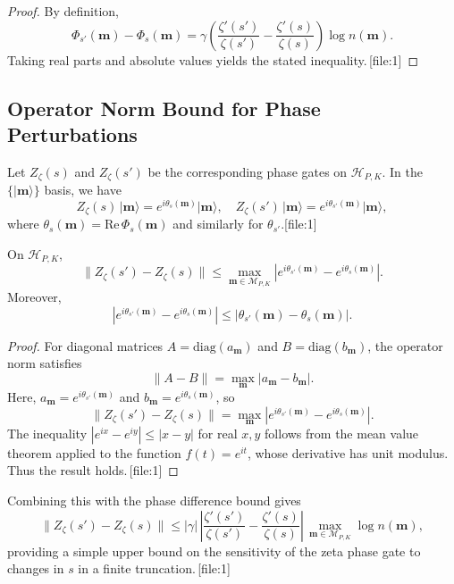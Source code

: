 \documentclass[11pt]{article}
\begin{document}
\begin{proof}
By definition,
\[
\Phi_{s'}(\mathbf{m}) - \Phi_s(\mathbf{m}) = \gamma \left( \frac{\zeta'(s')}{\zeta(s')} - \frac{\zeta'(s)}{\zeta(s)} \right) \log n(\mathbf{m}).
\]
Taking real parts and absolute values yields the stated inequality.\,[file:1]
\end{proof}

\subsection{Operator Norm Bound for Phase Perturbations}

Let \(Z_\zeta(s)\) and \(Z_\zeta(s')\) be the corresponding phase gates on \(\mathcal{H}_{P,K}\). In the \(\{\lvert \mathbf{m} \rangle\}\) basis, we have
\[
Z_\zeta(s)\,\lvert \mathbf{m} \rangle = e^{i\theta_s(\mathbf{m})} \lvert \mathbf{m} \rangle,\quad
Z_\zeta(s')\,\lvert \mathbf{m} \rangle = e^{i\theta_{s'}(\mathbf{m})} \lvert \mathbf{m} \rangle,
\]
where \(\theta_s(\mathbf{m}) = \mathrm{Re}\,\Phi_s(\mathbf{m})\) and similarly for \(\theta_{s'}.\)[file:1]

\begin{proposition}
On \(\mathcal{H}_{P,K}\),
\[
\| Z_\zeta(s') - Z_\zeta(s) \| \leq \max_{\mathbf{m} \in \mathcal{M}_{P,K}} \left| e^{i\theta_{s'}(\mathbf{m})} - e^{i\theta_s(\mathbf{m})} \right|.
\]
Moreover,
\[
\left| e^{i\theta_{s'}(\mathbf{m})} - e^{i\theta_s(\mathbf{m})} \right| \leq \left| \theta_{s'}(\mathbf{m}) - \theta_s(\mathbf{m}) \right|.
\]
\end{proposition}

\begin{proof}
For diagonal matrices \(A = \mathrm{diag}(a_{\mathbf{m}})\) and \(B = \mathrm{diag}(b_{\mathbf{m}})\), the operator norm satisfies
\[
\|A - B\| = \max_{\mathbf{m}} |a_{\mathbf{m}} - b_{\mathbf{m}}|.
\]
Here, \(a_{\mathbf{m}} = e^{i\theta_{s'}(\mathbf{m})}\) and \(b_{\mathbf{m}} = e^{i\theta_s(\mathbf{m})}\), so
\[
\| Z_\zeta(s') - Z_\zeta(s) \| = \max_{\mathbf{m}} \left| e^{i\theta_{s'}(\mathbf{m})} - e^{i\theta_s(\mathbf{m})} \right|.
\]
The inequality \(|e^{ix} - e^{iy}| \leq |x - y|\) for real \(x,y\) follows from the mean value theorem applied to the function \(f(t) = e^{it}\), whose derivative has unit modulus. Thus the result holds.\,[file:1]
\end{proof}

Combining this with the phase difference bound gives
\begin{equation}
\| Z_\zeta(s') - Z_\zeta(s) \| \leq |\gamma|\,\left| \frac{\zeta'(s')}{\zeta(s')} - \frac{\zeta'(s)}{\zeta(s)} \right| \,\max_{\mathbf{m} \in \mathcal{M}_{P,K}} \log n(\mathbf{m}),
\end{equation}
providing a simple upper bound on the sensitivity of the zeta phase gate to changes in \(s\) in a finite truncation.\,[file:1]
\end{document}
